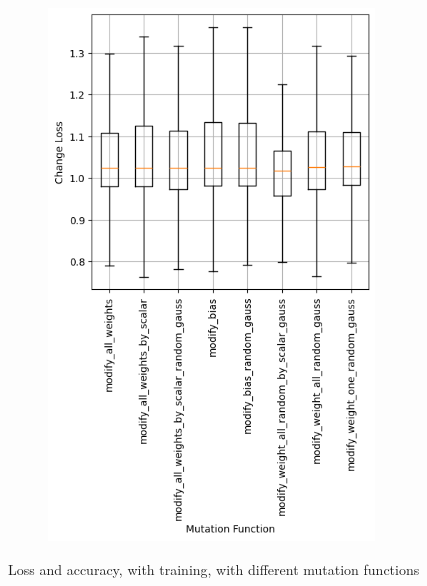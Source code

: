 \begin{figure}
\begin{subfigure}{0.5\textwidth}
        \includegraphics[width=0.95\textwidth]{plots/Mutatation_Trained_loss.png}
    \end{subfigure}
    \caption{Loss and accuracy, with training, with different mutation functions}
    \label{fig:mutation-functions-training}
\end{figure}
